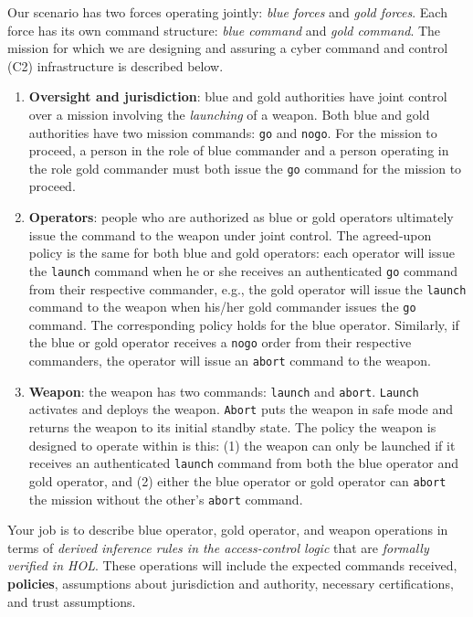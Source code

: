 \documentclass[10pt,twoside]{article}
\begin{document}
Our scenario has two forces operating jointly: \emph{blue forces} and
\emph{gold forces}.  Each force has its own command structure:
\emph{blue command} and \emph{gold command}. The mission for which we
are designing and assuring a cyber command and control (C2)
infrastructure is described below.
\begin{enumerate}
\item \textbf{Oversight and jurisdiction}: blue and gold authorities have joint
  control over a mission involving the \emph{launching} of a weapon.
  Both blue and gold authorities have two mission commands:
  \texttt{go} and \texttt{nogo}. For the mission to proceed, a person
  in the role of blue commander and a person operating in the role
  gold commander must both issue the \texttt{go} command for the mission
  to proceed.
\item \textbf{Operators}: people who are authorized as blue or gold operators
  ultimately issue the command to the weapon under joint control. The
  agreed-upon policy is the same for both blue and gold operators:
  each operator will issue the \texttt{launch} command when he or she
  receives an authenticated \texttt{go} command from their respective
  commander, e.g., the gold operator will issue the \texttt{launch}
  command to the weapon when his/her gold commander issues the
  \texttt{go} command. The corresponding policy holds for the blue
  operator.  Similarly, if the blue or gold operator receives a
  \texttt{nogo} order from their respective commanders, the operator
  will issue an \texttt{abort} command to the weapon.
\item \textbf{Weapon}: the weapon has two commands: \texttt{launch} and
  \texttt{abort}. \texttt{Launch} activates and deploys the
  weapon. \texttt{Abort} puts the weapon in safe mode and returns the
  weapon to its initial standby state. The policy the weapon is
  designed to operate within is this: (1) the weapon can only be
  launched if it receives an authenticated \texttt{launch} command
  from both the blue operator and gold operator, and (2) either the
  blue operator or gold operator can \texttt{abort} the mission
  without the other's \texttt{abort} command.
\end{enumerate}

Your job is to describe blue operator, gold operator, and weapon
operations in terms of \emph{derived inference rules in the
  access-control logic} that are \emph{formally verified in
  HOL}. These operations will include the expected commands received,
\textbf{policies}, assumptions about jurisdiction and authority,
necessary certifications, and trust assumptions.
\end{document}

